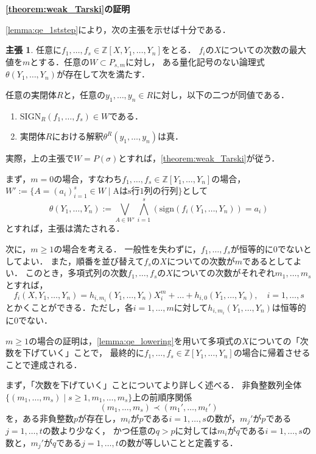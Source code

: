 \documentclass[uplatex, dvipdfmx]{jsarticle}
\makeatletter
\renewenvironment{proof}[1][\proofname]{\par
  \pushQED{\qed}%
  \normalfont \topsep6\p@\@plus6\p@\relax
  \trivlist
  \item\relax
  {\bfseries
  #1\@addpunct{.}}\hspace\labelsep\ignorespaces
}{%
  \popQED\endtrivlist\@endpefalse
}
\newcommand{\Z}{\mathbb{Z}}
\newcommand{\sign}{\mathrm{sign}}
\newcommand{\SIGN}{\mathrm{SIGN}}
\theoremstyle{definition}
\newtheorem*{claim*}{主張}
\renewcommand{\proofname}{\textbf{証明}}
\makeatother
\begin{document}
\begin{proof}[\cref{theorem:weak_Tarski}の証明]
     \cref{lemma:qe_1ststep}により，次の主張を示せば十分である．
     \begin{claim*}
          任意に$f_1, \dots, f_s \in \Z[X, Y_1, \dots, Y_n]$をとる．
          $f_i$の$X$についての次数の最大値を$m$とする．任意の$W \subset P_{s,m}$に対し，
          ある量化記号のない論理式$\theta(Y_1, \dots, Y_n)$が存在して次を満たす．

          任意の実閉体$R$と，任意の$y_1, \dots, y_n \in R$に対し，以下の二つが同値である．
          \begin{enumerate}
               \item $\SIGN_R(f_1, \dots, f_s) \in W$である．
               \item 実閉体$R$における解釈$\theta^R(y_1, \dots, y_n)$は真．
          \end{enumerate}
     \end{claim*}
     実際，上の主張で$W = P(\sigma)$とすれば，\cref{theorem:weak_Tarski}が従う．

     まず，$m=0$の場合，すなわち$f_1, \dots, f_s \in \Z[Y_1, \dots, Y_n]$の場合，
     $W':=\{A = (a_i)_{i=1}^s \in W \mid \text{Aはs行1列の行列}\}$として
     \[
          \theta(Y_1, \dots, Y_n) := \bigvee_{A \in W'}\bigwedge_{i=1}^s (\sign(f_i(Y_1, \dots, Y_n))=a_i) 
     \]
     とすれば，主張は満たされる．

     次に，$m \geq 1$の場合を考える．
     一般性を失わずに，$f_1, \dots, f_s$が恒等的に$0$でないとしてよい．
     また，順番を並び替えて$f_s$の$X$についての次数が$m$であるとしてよい．
     このとき，多項式列の次数$f_1, \dots, f_s$の$X$についての次数がそれぞれ$m_1, \dots, m_s$とすれば，
     \[
          f_i(X,Y_1, \dots, Y_n) = h_{i,m_i}(Y_1, \dots, Y_n)X^m_i + \dots + h_{i,0}(Y_1, \dots, Y_n), \quad i=1, \dots, s
     \]
     とかくことができる．ただし，各$i=1, \dots, m$に対して$h_{i,m_i}(Y_1, \dots, Y_n)$は恒等的に$0$でない．

     $m \geq 1$の場合の証明は，\cref{lemma:qe_lowering}を用いて多項式の$X$についての「次数を下げていく」ことで，
     最終的に$f_1, \dots, f_s \in \Z[Y_1, \dots, Y_n]$の場合に帰着させることで達成される．

     まず，「次数を下げていく」ことについてより詳しく述べる．
     非負整数列全体$\{(m_1, \dots, m_s) \mid s \geq 1, m_1, \dots, m_s\}$上の前順序関係
     \[
          (m_1, \dots, m_s) \prec (m_1', \dots, m_t')
     \]
     を，ある非負整数$p$が存在し，$m_i$が$p$である$i=1, \dots, s$の数が，$m_j'$が$p$である$j=1, \dots, t$の数より少なく，
     かつ任意の$q>p$に対しては$m_i$が$q$である$i=1, \dots, s$の数と，$m_j'$が$q$である$j=1, \dots, t$の数が等しいことと定義する．


\end{proof}
\end{document}
